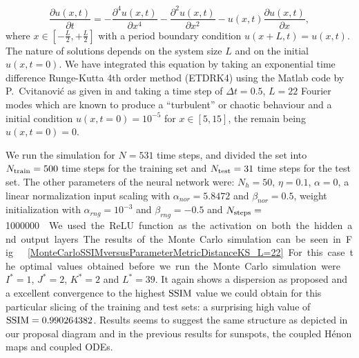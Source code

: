 \documentclass[journal]{IEEEtran}
\begin{document}
\begin{equation}
\label{kuramotoSivashinskyequation}
\frac{\partial u(x,t)}{\partial t} = -\frac{\partial^4 u(x,t)}{\partial x^4}-\frac{\partial^2 u(x,t)}{\partial x^2}-u(x,t)
\frac{\partial u(x,t)}{\partial x},
\end{equation}
where $x \in [-\frac{L}{2},+\frac{L}{2}]$ with a period boundary condition 
$u(x+L,t)=u(x,t)$. The nature of solutions depends on the system size $L$ and on the initial $u(x,t=0)$. 
We have integrated this equation by taking an exponential time difference Runge-Kutta 4th order method (ETDRK4)
using the Matlab code by P.\ Cvitanovi\'c as given in \cite{BibEntry2007Apr} and 
taking a time step of $\Delta t=0.5$, $L=22$ Fourier modes which are known to produce a ``turbulent'' or chaotic behaviour
and a initial condition $u(x,t=0)=10^{-5}$ for $x\in[5,15]$, the remain being $u(x,t=0)=0$.



We run the simulation for $N=531$ time steps, and divided the set into $N_{\textnormal{train}}=500$ time steps for the training set
and $N_{\textnormal{test}}=31$ time steps for the test set. The other parameters of the neural network were:
$N_h=50$, $\eta=0.1$, $\alpha=0$, a linear normalization input scaling with 
$\alpha_{nor} = 5.8472$ and $\beta_{nor} =0.5$, weight initialization 
with $\alpha_{rng} = 10^{-3}$ and $\beta_{rng} = -0.5$ and $N_{\textnormal{steps}}=$\SI{1000000}\nobreak. 
We used the ReLU function as the activation on both the hidden and output layers.

The results of the Monte Carlo simulation can be seen in Fig.\ \ref{MonteCarloSSIMversusParameterMetricDistanceKS_L=22}. For this 
case the optimal values obtained before we run the Monte Carlo simulation were $I^*=1$, $J^*=2$, $K^*=2$ and $L^*=39$. It again shows a dispersion as 
proposed and a excellent convergence to the highest $\textnormal{SSIM}$ value we could obtain for this particular slicing of the training and 
test sets: a surprising high value of $\textnormal{SSIM}=0.990264382$. Results seems to suggest the same structure as depicted in our 
proposal diagram and in the previous results for sunspots, the coupled H\'{e}non maps and coupled ODEs. 


\end{document}
